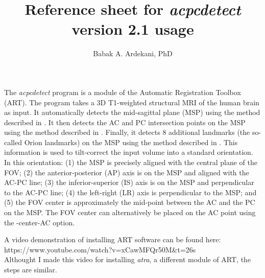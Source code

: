 \documentclass[11pt]{article}
\title{Reference sheet for {\it acpcdetect} version 2.1 usage}
\author{Babak A. Ardekani, PhD}
\begin{document}
\maketitle
{} 
The {\it acpcdetect} program is a module of the Automatic Registration Toolbox (ART). 
The program takes a 3D T1-weighted structural MRI of the human brain as input. 
It automatically detects the mid-sagittal plane (MSP) using the method described in \citep{pmid9533596}.
It then detects the AC and PC intersection points on the MSP using the method described in \citep{pmid19264138}. 
Finally, it detects 8 additional landmarks (the so-called Orion landmarks) on the MSP using the method 
described in \citep{pmid35288224}.  
This information is used to tilt-correct the input volume into a standard orientation.  
In this orientation: (1) the MSP is precisely aligned with the central plane of the FOV; 
(2) the anterior-posterior (AP) axis is on the MSP and aligned with the AC-PC line; 
(3) the inferior-superior (IS) axis is on the MSP and perpendicular to the AC-PC line; 
(4) the left-right (LR) axis is perpendicular to the MSP; and 
(5) the FOV center is approximately the mid-point between the AC and the PC on the MSP. 
The FOV center can alternatively be placed on the AC point using the -center-AC option.  
\vspace{3mm}

A video demonstration of installing ART software can be found here:
https://www.youtube.com/watch?v=xCawMFQr50M\&t=26s \\
Althought I made this video for installing {\it atra}, a different module of ART, the steps are similar.
\end{document}
